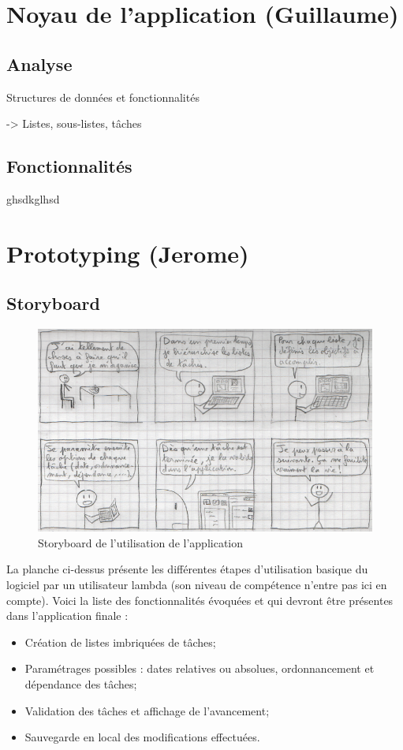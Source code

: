 \chapter{Noyau de l'application (Guillaume)}

	\section{Analyse}

		Structures de données et fonctionnalités
	
		-> Listes, sous-listes, tâches
		
	\section{Fonctionnalités}
	
		ghsdkglhsd
		
		


\chapter{Prototyping (Jerome)}

	\section{Storyboard}
		\begin{figure}[h!]
		   \includegraphics{img/stotyboard_ihm.png}
		   \caption{Storyboard de l'utilisation de l'application}
		\end{figure}
	
		La planche ci-dessus présente les différentes étapes d'utilisation basique du logiciel par un utilisateur lambda (son niveau de compétence n'entre pas ici en compte). Voici la liste des fonctionnalités évoquées et qui devront être présentes dans l'application finale :
		\begin{itemize}
			\item Création de listes imbriquées de tâches;
			\item Paramétrages possibles : dates relatives ou absolues, ordonnancement et dépendance des tâches;
			\item Validation des tâches et affichage de l'avancement;
			\item Sauvegarde en local des modifications effectuées.
		\end{itemize}
	
